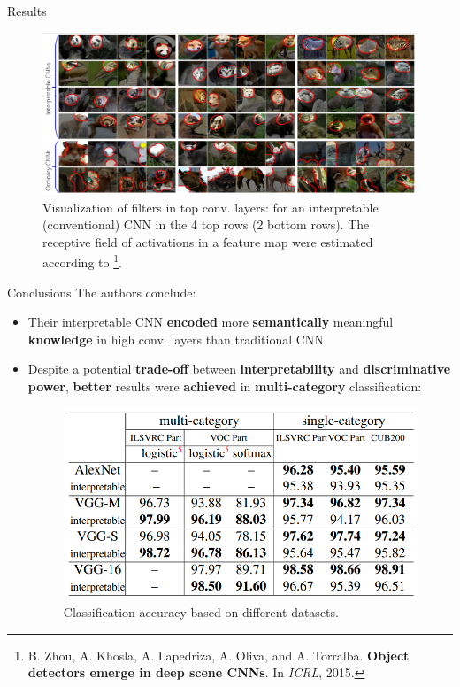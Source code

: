 \documentclass{beamer}
\begin{document}
\begin{frame}{Results}
    \begin{figure}
        \centering
        \includegraphics[width=1.00\linewidth]{figures/results.png}
        \caption{Visualization of filters in top conv. layers: for an interpretable (conventional) CNN in the 4 top rows (2 bottom rows). The receptive field of activations in a feature map were estimated according to \footnote{B. Zhou, A. Khosla, A. Lapedriza, A. Oliva, and A. Torralba. \textbf{Object detectors emerge in deep scene CNNs}. In \textit{ICRL}, 2015.}.}
        \label{fig:results}
    \end{figure}
\end{frame}

\begin{frame}{Conclusions}
    The authors conclude:
    \begin{itemize}[<+->]
        \item Their interpretable CNN \textbf{encoded} more \textbf{semantically} meaningful \textbf{knowledge} in high conv. layers than traditional CNN
        \item Despite a potential \textbf{trade-off} between \textbf{interpretability} and \textbf{discriminative power}, \textbf{better} results were \textbf{achieved} in \textbf{multi-category} classification:
        \begin{figure}
        \centering
        \includegraphics[width=0.6\linewidth]{figures/accuracy.png}
        \caption{Classification accuracy based on different datasets.}
        \label{fig:accuracy}
    \end{figure}
        
    \end{itemize}
\end{frame}
\end{document}
